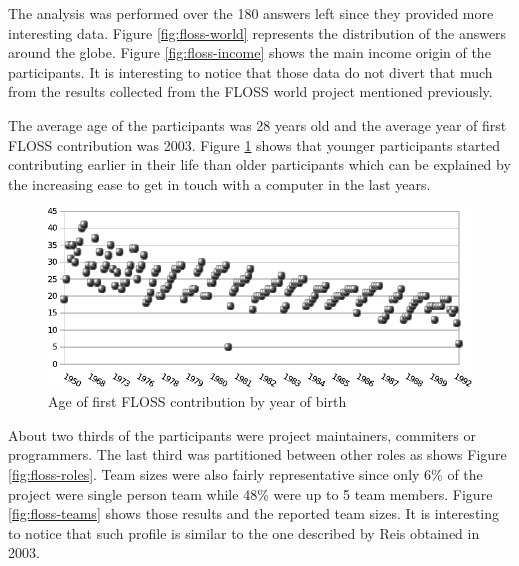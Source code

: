 \documentclass[lnbip]{svmultln}
\begin{document}
The analysis was performed over the 180 answers left since they
provided more interesting data. Figure \ref{fig:floss-world}
represents the distribution of the answers around the globe. Figure
\ref{fig:floss-income} shows the main income origin of the
participants. It is interesting to notice that those data do not
divert that much from the results collected from the FLOSS world
project mentioned previously.

The average age of the participants was 28 years old and the average
year of first FLOSS contribution was 2003. Figure
\ref{fig:floss-firstxp} shows that younger participants started
contributing earlier in their life than older participants which can
be explained by the increasing ease to get in touch with a computer in
the last years.

\begin{figure}[htb]
  \centering
  \includegraphics[scale=.9]{floss-firstxp.pdf}
  \caption{Age of first FLOSS contribution by year of birth}
  \label{fig:floss-firstxp}
\end{figure}

About two thirds of the participants were project maintainers,
commiters or programmers. The last third was partitioned between other
roles as shows Figure \ref{fig:floss-roles}. Team sizes were also
fairly representative since only 6\% of the project were single person
team while 48\% were up to 5 team members. Figure
\ref{fig:floss-teams} shows those results and the reported team
sizes. It is interesting to notice that such profile is similar to the
one described by Reis \cite{reis2003} obtained in 2003.
\end{document}
